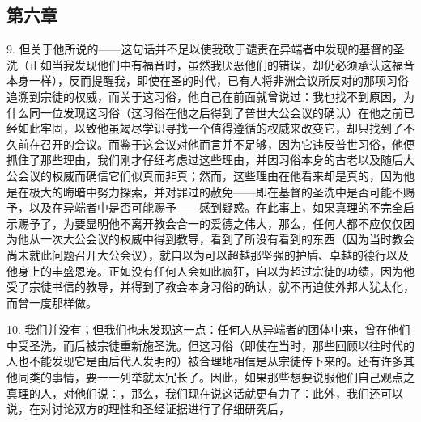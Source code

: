 
\subsection{第六章}

9. 但关于他所说的——这句话并不足以使我敢于谴责在异端者中发现的基督的圣洗（正如当我发现他们中有福音时，虽然我厌恶他们的错误，却仍必须承认这福音本身一样），反而提醒我，即使在圣的时代，已有人将非洲会议所反对的那项习俗追溯到宗徒的权威，而关于这习俗，他自己在前面就曾说过：我也找不到原因，为什么同一位发现这习俗（这习俗在他之后得到了普世大公会议的确认）在他之前已经如此牢固，以致他虽竭尽学识寻找一个值得遵循的权威来改变它，却只找到了不久前在召开的会议。而鉴于这会议对他而言并不足够，因为它违反普世习俗，他便抓住了那些理由，我们刚才仔细考虑过这些理由，并因习俗本身的古老以及随后大公会议的权威而确信它们似真而非真；然而，这些理由在他看来却是真的，因为他是在极大的晦暗中努力探索，并对罪过的赦免——即在基督的圣洗中是否可能不赐予，以及在异端者中是否可能赐予——感到疑惑。在此事上，如果真理的不完全启示赐予了，为要显明他不离开教会合一的爱德之伟大，那么，任何人都不应仅仅因为他从一次大公会议的权威中得到教导，看到了所没有看到的东西（因为当时教会尚未就此问题召开大公会议），就自以为可以超越那坚强的护盾、卓越的德行以及他身上的丰盛恩宠。正如没有任何人会如此疯狂，自以为超过宗徒的功绩，因为他受了宗徒书信的教导，并得到了教会本身习俗的确认，就不再迫使外邦人犹太化，而曾一度那样做。\par

10. 我们并没有；但我们也未发现这一点：任何人从异端者的团体中来，曾在他们中受圣洗，而后被宗徒重新施圣洗。但这习俗（即使在当时，那些回顾以往时代的人也不能发现它是由后代人发明的）被合理地相信是从宗徒传下来的。还有许多其他同类的事情，要一一列举就太冗长了。因此，如果那些想要说服他们自己观点之真理的人，对他们说：，那么，我们现在说这话就更有力了：此外，我们还可以说，在对讨论双方的理性和圣经证据进行了仔细研究后，\par

